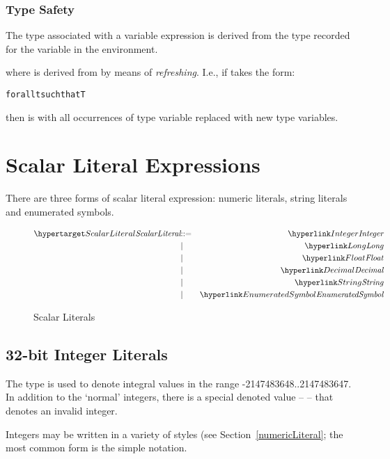 \subsubsection{Type Safety}
The type associated with a variable expression is derived from the type recorded for the variable in the environment.
\begin{prooftree}
\end{prooftree}
where  is derived from  by means of \emph{refreshing}. I.e., if  takes the form:
\begin{alltt}
for all t\subi{} such that T
\end{alltt}
then  is  with all occurrences of type variable  replaced with new type variables.


\section{Scalar Literal Expressions}
\label{scalarExpression}

There are three forms of scalar literal expression: numeric literals, string literals and enumerated symbols.

\begin{figure}[htbp]
\begin{eqnarray*}
\ntDef{ScalarLiteral}&\arrow&\ntRef{Integer}\\
&\choice&\ntRef{Long}\\
&\choice&\ntRef{Float}\\
&\choice&\ntRef{Decimal}\\
&\choice&\ntRef{String}\\
&\choice&\ntRef{EnumeratedSymbol}
\end{eqnarray*}
\caption{Scalar Literals}
\label{scalarExpressionFig}
\end{figure}

\subsection{32-bit Integer Literals}
\label{integerType}

The  type is used to denote integral values in the range -2147483648..2147483647. In addition to the `normal' integers, there is a special denoted value --  -- that denotes an invalid integer.

Integers may be written in a variety of styles (see Section~\vref{numericLiteral}; the most common form is the simple  notation.

